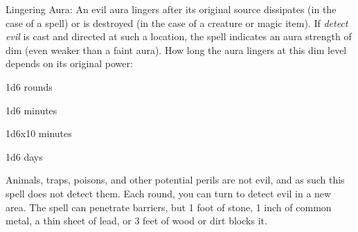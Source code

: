 Lingering Aura: An evil aura lingers after its original source dissipates
(in the case of a spell) or is destroyed (in the case of a creature or magic item).
If \textit{detect evil} is cast and directed at such a location, the spell indicates
an aura strength of dim (even weaker than a faint aura). How long the aura lingers
at this dim level depends on its original power:
\begin{description*}
\item[Faint] 1d6 rounds
\item[Moderate] 1d6 minutes
\item[Strong] 1d6x10 minutes
\item[Overwhelming] 1d6 days
\end{description*}
Animals, traps, poisons, and other potential perils are not evil, and as such this
spell does not detect them.
Each round, you can turn to detect evil in a new area. The spell can penetrate
barriers, but 1 foot of stone, 1 inch of common metal, a thin sheet of lead, or
3 feet of wood or dirt blocks it.
